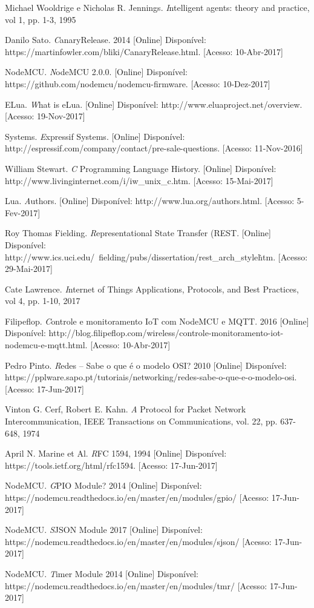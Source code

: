 \documentclass[journal]{IEEEtran}
\begin{document}
\begin{thebibliography}{1}
Michael Wooldrige e Nicholas R. Jennings. \emph Intelligent agents: theory and practice, vol 1, pp. 1-3, 1995

Danilo Sato. \emph CanaryRelease. 2014 [Online] Disponível: https://martinfowler.com/bliki/CanaryRelease.html. [Acesso: 10-Abr-2017]

NodeMCU. \emph NodeMCU 2.0.0. [Online] Disponível: https://github.com/nodemcu/nodemcu-firmware. [Acesso: 10-Dez-2017]

ELua. \emph What is eLua. [Online] Disponível: http://www.eluaproject.net/overview. [Acesso: 19-Nov-2017]

Systems. \emph Expressif Systems. [Online] Disponível: http://espressif.com/company/contact/pre-sale-questions. [Acesso: 11-Nov-2016]

William Stewart. \emph C Programming Language History. [Online] Disponível: http://www.livinginternet.com/i/iw\_unix\_c.htm. [Acesso: 15-Mai-2017]

Lua. \emph Authors. [Online] Disponível: http://www.lua.org/authors.html. [Acesso: 5-Fev-2017]

Roy Thomas Fielding. \emph Representational State Transfer (REST. [Online] Disponível: http://www.ics.uci.edu/~fielding/pubs/dissertation/rest\_arch\_style\.htm. [Acesso: 29-Mai-2017]

Cate Lawrence. \emph Internet of Things Applications, Protocols, and Best Practices, vol 4, pp. 1-10, 2017

Filipeflop. \emph Controle e monitoramento IoT com NodeMCU e MQTT. 2016 [Online] Disponível: http://blog.filipeflop.com/wireless/controle-monitoramento-iot-nodemcu-e-mqtt.html. [Acesso: 10-Abr-2017]

Pedro Pinto. \emph Redes – Sabe o que é o modelo OSI? 2010 [Online] Disponível:
https://pplware.sapo.pt/tutoriais/networking/redes-sabe-o-que-e-o-modelo-osi. [Acesso: 17-Jun-2017]

Vinton G. Cerf, Robert E. Kahn. \emph A Protocol for Packet Network Intercommunication, IEEE Transactions on Communications, vol. 22, pp. 637-648, 1974

April N. Marine et Al. \emph RFC 1594, 1994 [Online] Disponível: https://tools.ietf.org/html/rfc1594. [Acesso: 17-Jun-2017]


NodeMCU. \emph GPIO Module? 2014 [Online] Disponível:
https://nodemcu.readthedocs.io/en/master/en/modules/gpio/
[Acesso: 17-Jun-2017]

NodeMCU. \emph SJSON Module 2017 [Online] Disponível:
https://nodemcu.readthedocs.io/en/master/en/modules/sjson/
[Acesso: 17-Jun-2017]

NodeMCU. \emph Timer Module 2014 [Online] Disponível:
https://nodemcu.readthedocs.io/en/master/en/modules/tmr/
[Acesso: 17-Jun-2017]
\end{thebibliography}
\end{document}
